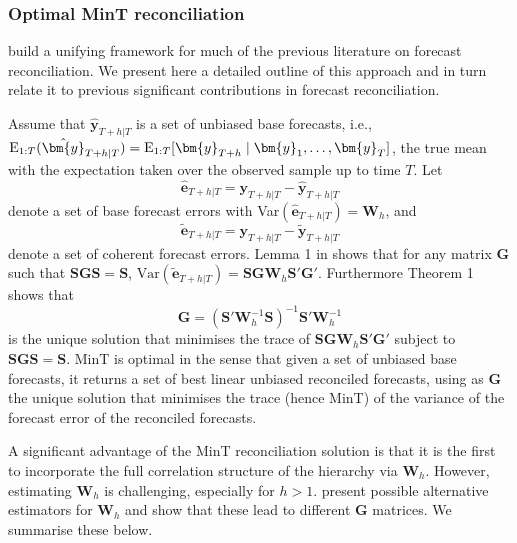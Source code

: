 {\subsubsection{Optimal MinT reconciliation}

\citet{WicEtAl2019} build a unifying framework for much of the previous literature on forecast reconciliation. We present here a detailed outline of this approach and in turn relate it to previous significant contributions in forecast reconciliation.

Assume that $\hat{\bm{y}}_{T+h|T}$ is a set of unbiased base forecasts, i.e., $\E_{1:T}(\hat{\bm{y}}_{T+h|T})= \E_{1:T}[\bm{y}_{T+h}\mid\bm{y}_1,\dots,\bm{y}_T]$, the true mean with the expectation taken over the observed sample up to time $T$.
Let
\begin{equation}\label{eq:base errors}
	\hat{\bm{e}}_{T+h|T} = \bm{y}_{T+h|T}-\hat{\bm{y}}_{T+h|T}
\end{equation}
denote a set of base forecast errors with Var$(\hat{\bm{e}}_{T+h|T})=\bm{W}_h$, and
\begin{equation*}
	\tilde{\bm{e}}_{T+h|T} = \bm{y}_{T+h|T}-\tilde{\bm{y}}_{T+h|T}
\end{equation*} denote a set of coherent forecast errors. Lemma 1 in \citet{WicEtAl2019} shows that for any matrix $\bm{G}$ such that $\bm{S}\bm{G}\bm{S}=\bm{S}$, $\text{Var}(\tilde{\bm{e}}_{T+h|T})=\bm{S}\bm{G}\bm{W}_h\bm{S}'\bm{G}'
$. Furthermore Theorem 1 shows that
\begin{equation} \label{eq:MinT}
	\bm{G} = (\bm{S}'{\bm{W}}^{-1}_h\bm{S})^{-1}\bm{S}'{\bm{W}}^{-1}_h
\end{equation}
is the unique solution that minimises the trace of $\bm{S}\bm{G}\bm{W}_h\bm{S}'\bm{G}'$ subject to $\bm{S}\bm{G}\bm{S}=\bm{S}$. MinT is optimal in the sense that given a set of unbiased base forecasts, it returns a set of best linear unbiased reconciled forecasts, using as $\bm{G}$ the unique solution that minimises the trace (hence MinT) of the variance of the forecast error of the reconciled forecasts.

A significant advantage of the MinT reconciliation solution is that it is the first to incorporate the full correlation structure of the hierarchy via $\bm{W}_{h}$. However, estimating $\bm{W}_{h}$ is challenging, especially for $h>1$. \citet{WicEtAl2019} present possible alternative estimators for $\bm{W}_{h}$ and show that these lead to different $\bm{G}$ matrices. We summarise these below.

}
